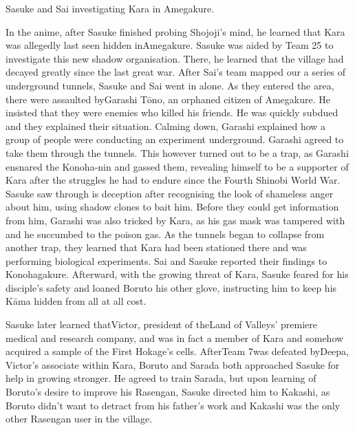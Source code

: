 \documentclass[a4paper,12pt]{article}
\begin{document}
Sasuke and Sai investigating Kara in Amegakure.\\ \par \vspace{0.5cm}

In the anime, after Sasuke finished probing Shojoji's mind, he learned that Kara was allegedly last seen hidden inAmegakure. Sasuke was aided by Team 25 to investigate this new shadow organisation. There, he learned that the village had decayed greatly since the last great war. After Sai's team mapped our a series of underground tunnels, Sasuke and Sai went in alone. As they entered the area, there were assaulted byGarashi Tōno, an orphaned citizen of Amegakure. He insisted that they were enemies who killed his friends. He was quickly subdued and they explained their situation. Calming down, Garashi explained how a group of people were conducting an experiment underground. Garashi agreed to take them through the tunnels. This however turned out to be a trap, as Garashi ensnared the Konoha-nin and gassed them, revealing himself to be a supporter of Kara after the struggles he had to endure since the Fourth Shinobi World War. Sasuke saw through is deception after recognising the look of shameless anger about him, using shadow clones to bait him. Before they could get information from him, Garashi was also tricked by Kara, as his gas mask was tampered with and he succumbed to the poison gas. As the tunnels began to collapse from another trap, they learned that Kara had been stationed there and was performing biological experiments. Sai and Sasuke reported their findings to Konohagakure. Afterward, with the growing threat of Kara, Sasuke feared for his disciple's safety and loaned Boruto his other glove, instructing him to keep his Kāma hidden from all at all cost.\\ \par \vspace{0.5cm}

Sasuke later learned thatVictor, president of theLand of Valleys' premiere medical and research company, and was in fact a member of Kara and somehow acquired a sample of the First Hokage's cells. AfterTeam 7was defeated byDeepa, Victor's associate within Kara, Boruto and Sarada both approached Sasuke for help in growing stronger. He agreed to train Sarada, but upon learning of Boruto's desire to improve his Rasengan, Sasuke directed him to Kakashi, as Boruto didn't want to detract from his father's work and Kakashi was the only other Rasengan user in the village.\\ \par \vspace{0.5cm}
\end{document}
